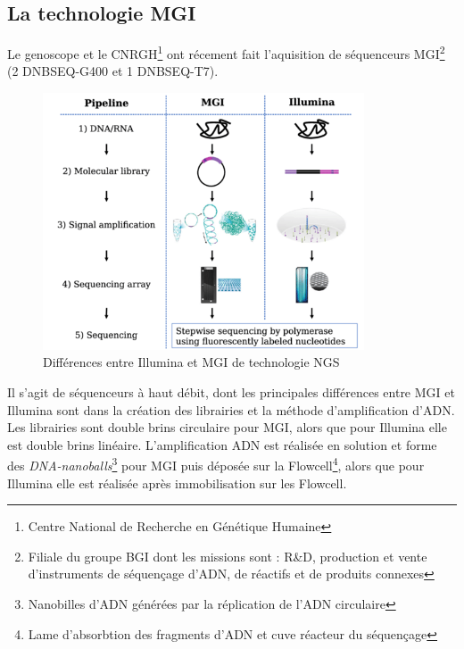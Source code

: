 \subsection{La technologie MGI}
Le genoscope et le CNRGH\footnote{Centre National de Recherche en Génétique Humaine} ont récement fait l'aquisition de séquenceurs MGI\footnote{Filiale du groupe BGI dont les missions sont : R\&D, production et vente d'instruments de séquençage d'ADN, de réactifs et de produits connexes} (2 DNBSEQ-G400 et 1 DNBSEQ-T7).


\begin{minipage}{0.45\textwidth}
	\begin{figure}[H]
        \centering
        \includegraphics[width=0.85\textwidth]{img/MGI_vs_Illumina.png}
        \caption{\footnotesize{Différences entre Illumina et MGI de technologie NGS}}
        \label{fig-Illu-vs-MGI}
    \end{figure}
\end{minipage} 
\hfill
\begin{minipage}{0.45\textwidth}
    Il s'agit de séquenceurs à haut débit, dont les principales différences entre MGI et Illumina sont dans la création des librairies et la méthode d'amplification d'ADN. Les librairies sont double brins circulaire pour MGI, alors que pour Illumina elle est double brins linéaire. L'amplification ADN est réalisée en solution et forme des \emph{DNA-nanoballs}\footnote{Nanobilles d'ADN générées par la réplication de l'ADN circulaire} pour MGI puis déposée sur la Flowcell\footnote{Lame d'absorbtion des fragments d'ADN et cuve réacteur du séquençage}, alors que pour Illumina elle est réalisée après immobilisation sur les Flowcell.
\end{minipage}

